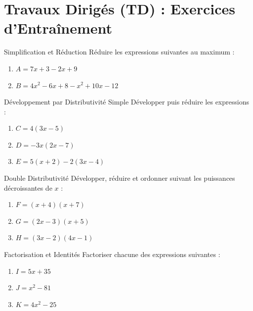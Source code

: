 \section{Travaux Dirigés (TD) : Exercices d'Entraînement}

\begin{exercice}[2 pts]{\capRealiser}{Simplification et Réduction}
Réduire les expressions suivantes au maximum :
\begin{enumerate}
    \item $A = 7x + 3 - 2x + 9$
    \item $B = 4x^2 - 6x + 8 - x^2 + 10x - 12$
\end{enumerate}
\lignesreponse[4]
\end{exercice}

\begin{exercice}[2 pts]{\capRealiser}{Développement par Distributivité Simple}
Développer puis réduire les expressions :
\begin{enumerate}
    \item $C = 4(3x - 5)$
    \item $D = -3x(2x - 7)$
    \item $E = 5(x + 2) - 2(3x - 4)$
\end{enumerate}
\lignesreponse[6]
\end{exercice}

\begin{exercice}[3 pts]{\capRealiser}{Double Distributivité}
Développer, réduire et ordonner suivant les puissances décroissantes de $x$ :
\begin{enumerate}
    \item $F = (x + 4)(x + 7)$
    \item $G = (2x - 3)(x + 5)$
    \item $H = (3x - 2)(4x - 1)$
\end{enumerate}
\lignesreponse[6]
\end{exercice}

\begin{exercice}[2 pts]{\capRealiser}{Factorisation et Identités}
Factoriser chacune des expressions suivantes :
\begin{enumerate}
    \item $I = 5x + 35$
    \item $J = x^2 - 81$
    \item $K = 4x^2 - 25$
\end{enumerate}
\lignesreponse[5]
\end{exercice}

